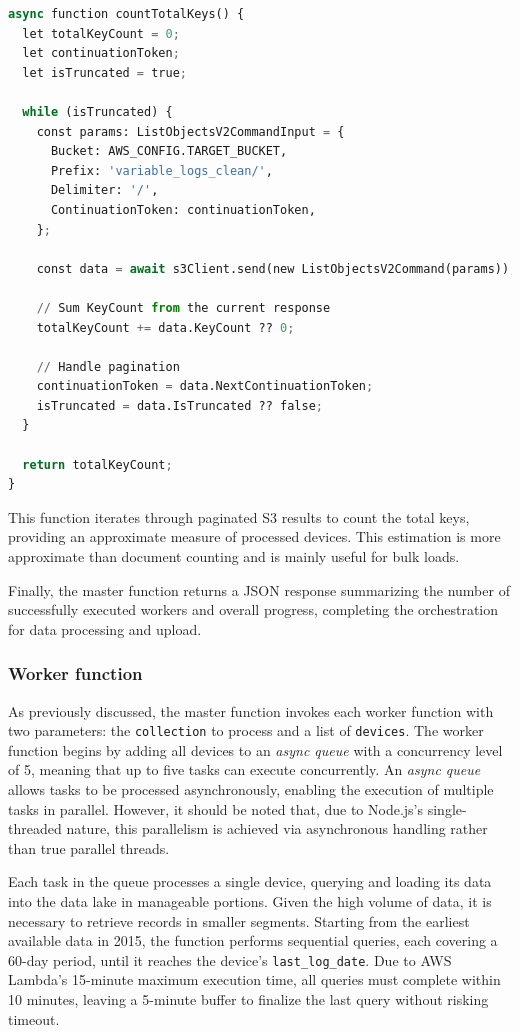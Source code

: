 \begin{lstlisting}[language=Python, caption=\texttt{countTotalKeys} function]
async function countTotalKeys() {
  let totalKeyCount = 0;
  let continuationToken;
  let isTruncated = true;

  while (isTruncated) {
    const params: ListObjectsV2CommandInput = {
      Bucket: AWS_CONFIG.TARGET_BUCKET,
      Prefix: 'variable_logs_clean/',
      Delimiter: '/',
      ContinuationToken: continuationToken,
    };

    const data = await s3Client.send(new ListObjectsV2Command(params));

    // Sum KeyCount from the current response
    totalKeyCount += data.KeyCount ?? 0;

    // Handle pagination
    continuationToken = data.NextContinuationToken;
    isTruncated = data.IsTruncated ?? false;
  }

  return totalKeyCount;
}
\end{lstlisting}

This function iterates through paginated S3 results to count the total keys, providing an approximate measure of processed devices. This estimation is more approximate than document counting and is mainly useful for bulk loads.

Finally, the master function returns a JSON response summarizing the number of successfully executed workers and overall progress, completing the orchestration for data processing and upload.

\subsubsection{Worker function}

As previously discussed, the master function invokes each worker function with two parameters: the \texttt{collection} to process and a list of \texttt{devices}. The worker function begins by adding all devices to an \textit{async queue} with a concurrency level of 5, meaning that up to five tasks can execute concurrently. An \textit{async queue} allows tasks to be processed asynchronously, enabling the execution of multiple tasks in parallel. However, it should be noted that, due to Node.js's single-threaded nature, this parallelism is achieved via asynchronous handling rather than true parallel threads.

Each task in the queue processes a single device, querying and loading its data into the data lake in manageable portions. Given the high volume of data, it is necessary to retrieve records in smaller segments. Starting from the earliest available data in 2015, the function performs sequential queries, each covering a 60-day period, until it reaches the device's \texttt{last\_log\_date}. Due to AWS Lambda's 15-minute maximum execution time, all queries must complete within 10 minutes, leaving a 5-minute buffer to finalize the last query without risking timeout.

